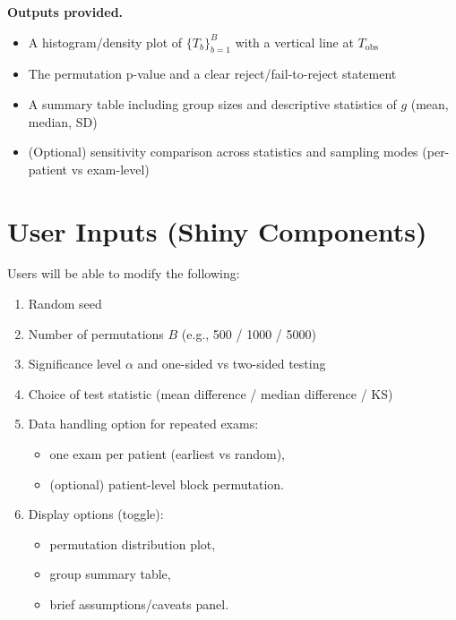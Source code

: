\documentclass{article}
\begin{document}
\begin{normalsize}
    \noindent \textbf{Outputs provided.}
    \begin{itemize}
        \item A histogram/density plot of $\{T_b\}_{b=1}^B$ with a vertical line at $T_{\text{obs}}$
        \item The permutation p-value and a clear reject/fail-to-reject statement
        \item A summary table including group sizes and descriptive statistics of $g$ (mean, median, SD)
        \item (Optional) sensitivity comparison across statistics and sampling modes (per-patient vs exam-level)
    \end{itemize}

	\section{User Inputs (Shiny Components)}
    Users will be able to modify the following:
    \begin{enumerate}
        \item Random seed
        \item Number of permutations $B$ (e.g., 500 / 1000 / 5000)
        \item Significance level $\alpha$ and one-sided vs two-sided testing
        \item Choice of test statistic (mean difference / median difference / KS)
        \item Data handling option for repeated exams:
            \begin{itemize}
                \item one exam per patient (earliest vs random),
                \item (optional) patient-level block permutation.
            \end{itemize}
        \item Display options (toggle):
            \begin{itemize}
                \item permutation distribution plot,
                \item group summary table,
                \item brief assumptions/caveats panel.
            \end{itemize}
    \end{enumerate}

\end{normalsize}

\nocite{*}


\end{document}
